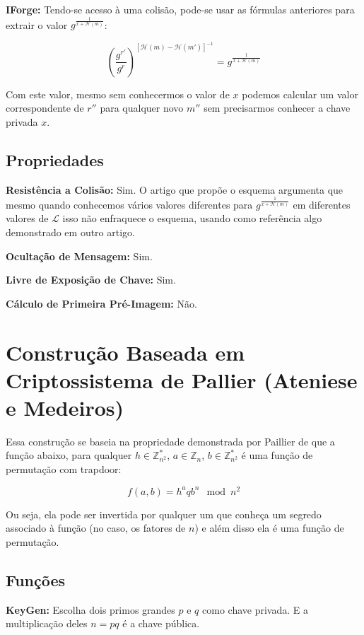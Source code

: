 \documentclass[a4paper]{article}
\begin{document}
\textbf{IForge:} Tendo-se acesso à uma colisão, pode-se usar as
fórmulas anteriores para extrair o valor
$g^{\frac{1}{x+\mathcal{H}(m)}}$:

$$
\left(\frac{g^{r'}}{g^r}\right)^{[\mathcal{H}(m)-\mathcal{H}(m')]^{-1}} = g^{\frac{1}{x+\mathcal{H}(m)}}
$$


Com este valor, mesmo sem conhecermos o valor de $x$ podemos calcular
um valor correspondente de $r''$ para qualquer novo $m''$ sem
precisarmos conhecer a chave privada $x$.

\subsection{Propriedades}

\textbf{Resistência a Colisão: }Sim. O artigo que propõe o esquema
argumenta que mesmo quando conhecemos vários valores diferentes para
$g^{\frac{1}{x+\mathcal{H}(m)}}$ em diferentes valores de
$\mathcal{L}$ isso não enfraquece o esquema, usando como referência
algo demonstrado em outro artigo.

\textbf{Ocultação de Mensagem: }Sim.

\textbf{Livre de Exposição de Chave: }Sim.

\textbf{Cálculo de Primeira Pré-Imagem: }Não.

\section{Construção Baseada em Criptossistema de Pallier (Ateniese e Medeiros) \cite{ateniese}}

Essa construção se baseia na propriedade demonstrada por
Paillier\cite{paillier} de que a função abaixo, para qualquer $h \in
\mathbb{Z}^*_{n^2}$, $a\in\mathbb{Z}_n$, $b\in\mathbb{Z}^*_{n^2}$ é
uma função de permutação com trapdoor:

$$
f(a, b) = h^aqb^n \mod n^2
$$

Ou seja, ela pode ser invertida por qualquer um que conheça um segredo
associado à função (no caso, os fatores de $n$) e além disso ela é uma
função de permutação.

\subsection{Funções}

\textbf{KeyGen: } Escolha dois primos grandes $p$ e $q$ como chave
privada. E a multiplicação deles $n=pq$ é a chave pública.
\end{document}
